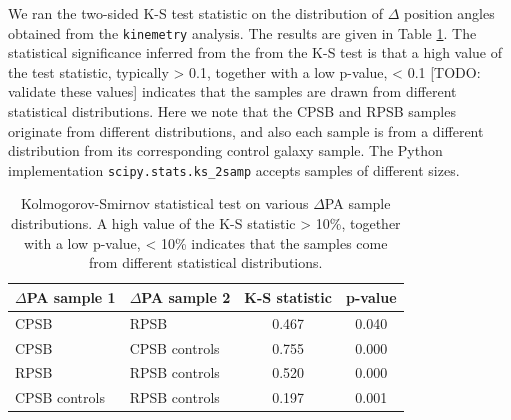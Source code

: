 We ran the two-sided K-S test statistic on the distribution of $\Delta$ position angles obtained from the \texttt{kinemetry} analysis. The results are given in Table \ref{tab:K-S-tests}. The statistical significance inferred from the from the K-S test is that a high value of the test statistic, typically > 0.1, together with a low p-value, < 0.1 [TODO: validate these values] indicates that the samples are drawn from different statistical distributions. Here we note that the CPSB and RPSB samples originate from different distributions, and also each sample is from a different distribution from its corresponding control galaxy sample. The Python implementation \texttt{scipy.stats.ks\_2samp} accepts samples of different sizes.

\begin{table}
\caption[Kolmogorov-Smirnov statistical test]{Kolmogorov-Smirnov statistical test on various $\Delta$PA sample distributions. A high value of the K-S statistic > 10\%, together with a low p-value, < 10\% indicates that the samples come from different statistical distributions.}
\label{tab:K-S-tests}
\begin{tabular}{llcc}
\hline
$\Delta$PA sample 1  & $\Delta$PA sample 2 & K-S statistic & p-value \\
\hline
CPSB & RPSB & 0.467 & 0.040 \\
CPSB & CPSB controls & 0.755 & 0.000 \\
RPSB & RPSB controls & 0.520 & 0.000 \\
CPSB controls & RPSB controls & 0.197 & 0.001 \\
\hline
\end{tabular}
\end{table}
